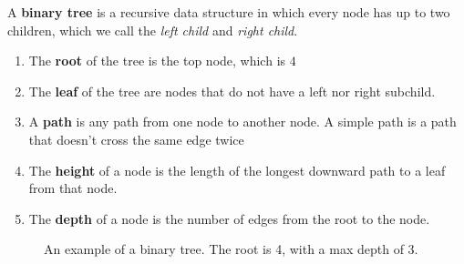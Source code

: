   \begin{definition}
    A \textbf{binary tree} is a recursive data structure in which every node has up to two children, which we call the \textit{left child} and \textit{right child}. 

    \begin{enumerate}
      \item The \textbf{root} of the tree is the top node, which is $4$
      \item The \textbf{leaf} of the tree are nodes that do not have a left nor right subchild. 
      \item A \textbf{path} is any path from one node to another node. A simple path is a path that doesn't cross the same edge twice 
      \item The \textbf{height} of a node is the length of the longest downward path to a leaf from that node. 
      \item The \textbf{depth} of a node is the number of edges from the root to the node. 
    \end{enumerate}
    
    \begin{figure}[H]
      \centering 
      \caption{An example of a binary tree. The root is 4, with a max depth of 3. } 
      \label{fig:binary_tree}
    \end{figure}
  \end{definition}

